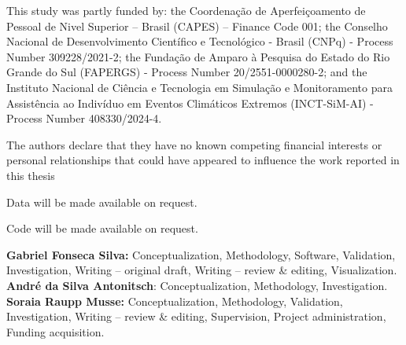 \documentclass[pdflatex,sn-mathphys-num]{sn-jnl}%
\theoremstyle{thmstyleone}%
\theoremstyle{thmstyletwo}%
\theoremstyle{thmstylethree}%
\begin{document}

This study was partly funded by: the Coordenação de Aperfeiçoamento de Pessoal de Nivel Superior – Brasil (CAPES) – Finance Code 001; the Conselho Nacional de Desenvolvimento Científico e Tecnológico - Brasil (CNPq) - Process Number 309228/2021-2; the Fundação de Amparo à Pesquisa do Estado do Rio Grande do Sul (FAPERGS) - Process Number 20/2551-0000280-2; and the Instituto Nacional de Ciência e Tecnologia em
Simulação e Monitoramento para Assistência ao
Indivíduo em Eventos Climáticos Extremos (INCT-SiM-AI) - Process Number 408330/2024-4.

The authors declare that they have no known competing financial interests or personal relationships that could have appeared to
influence the work reported in this thesis

Data will be made available on request.

Code will be made available on request.

\textbf{Gabriel Fonseca Silva:} Conceptualization, Methodology, Software, Validation, Investigation, Writing – original draft, Writing – review \& editing, Visualization. \textbf{André da Silva Antonitsch}: Conceptualization, Methodology, Investigation. \textbf{Soraia Raupp Musse:} Conceptualization, Methodology, Validation, Investigation, Writing – review \& editing, Supervision, Project administration, Funding acquisition.
\end{document}
